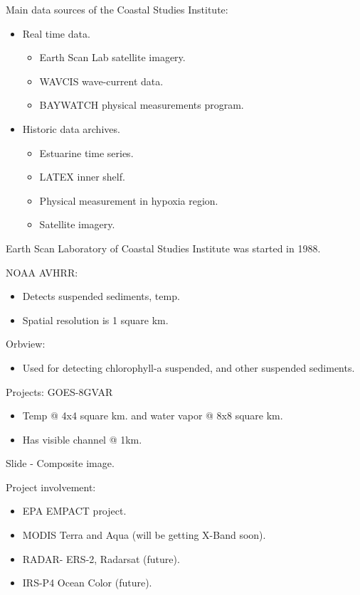 Main data sources of the Coastal Studies Institute:

\begin{itemize}
\item Real time data.
\begin{itemize}
\item Earth Scan Lab satellite imagery.
\item WAVCIS wave-current data.
\item BAYWATCH physical measurements program.
\end{itemize}

\item Historic data archives.
\begin{itemize}
\item Estuarine time series.
\item LATEX inner shelf.
\item Physical measurement in hypoxia region.
\item Satellite imagery.
\end{itemize}
\end{itemize}

Earth Scan Laboratory of Coastal Studies Institute was started in 1988.

NOAA AVHRR:
\begin{itemize}
\item Detects suspended sediments, temp.
\item Spatial resolution is 1 square km.
\end{itemize}

Orbview:
\begin{itemize}
\item Used for detecting chlorophyll-a suspended, and other suspended sediments.
\end{itemize}

Projects: GOES-8GVAR
\begin{itemize}
\item Temp @ 4x4 square km. and water vapor @ 8x8 square km.
\item Has visible channel @ 1km.
\end{itemize}

Slide - Composite image.

Project involvement:
\begin{itemize}
\item EPA EMPACT project.
\item MODIS Terra and Aqua (will be getting X-Band soon).
\item RADAR- ERS-2, Radarsat (future).
\item IRS-P4 Ocean Color (future).
\end{itemize}

